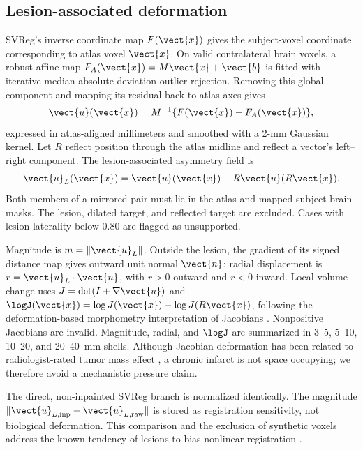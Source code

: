 \documentclass[runningheads]{llncs}
\begin{document}
\subsection{Lesion-associated deformation }
SVReg's inverse coordinate map $F(\vect{x})$ gives the subject-voxel coordinate
corresponding to atlas voxel $\vect{x}$. On valid contralateral brain voxels, a
robust affine map $F_A(\vect{x})=M\vect{x}+\vect{b}$ is fitted with iterative
median-absolute-deviation outlier rejection. Removing this global component and
mapping its residual back to atlas axes gives
\begin{equation}
 \vect{u}(\vect{x})=M^{-1}\{F(\vect{x})-F_A(\vect{x})\},
 \label{eq:residual}
\end{equation}
expressed in atlas-aligned millimeters and smoothed with a 2-mm Gaussian kernel.
Let $R$ reflect position through the atlas midline and reflect a vector's
left--right component. The lesion-associated asymmetry field is
\begin{equation}
 \vect{u}_{L}(\vect{x})=\vect{u}(\vect{x})-R\vect{u}(R\vect{x}).
 \label{eq:mirror}
\end{equation}
Both members of a mirrored pair must lie in the atlas and mapped subject brain
masks. The lesion, dilated target, and reflected target are excluded. Cases
with lesion laterality below 0.80 are flagged as unsupported.

Magnitude is $m=\|\vect{u}_L\|$. Outside the lesion, the gradient of its signed
distance map gives outward unit normal $\vect{n}$; radial displacement is
$r=\vect{u}_L\cdot\vect{n}$, with $r>0$ outward and $r<0$ inward. Local volume
change uses $J=\det(I+\nabla\vect{u})$ and
$\logJ(\vect{x})=\log J(\vect{x})-\log J(R\vect{x})$, following the
deformation-based morphometry interpretation of Jacobians
\cite{Chung2001}. Nonpositive Jacobians are invalid. Magnitude, radial, and
$\logJ$ are summarized in 3--5, 5--10, 10--20, and 20--40~mm shells. Although
Jacobian deformation has been related to radiologist-rated tumor mass effect
\cite{Zacharaki2009}, a chronic infarct is not space occupying; we therefore
avoid a mechanistic pressure claim.

The direct, non-inpainted SVReg branch is normalized identically. The magnitude
$\|\vect{u}_{L,\mathrm{inp}}-\vect{u}_{L,\mathrm{raw}}\|$ is stored as
registration sensitivity, not biological deformation. This comparison and
the exclusion of synthetic voxels address the known tendency of lesions to
bias nonlinear registration \cite{Brett2001,Sdika2009}.
\end{document}

